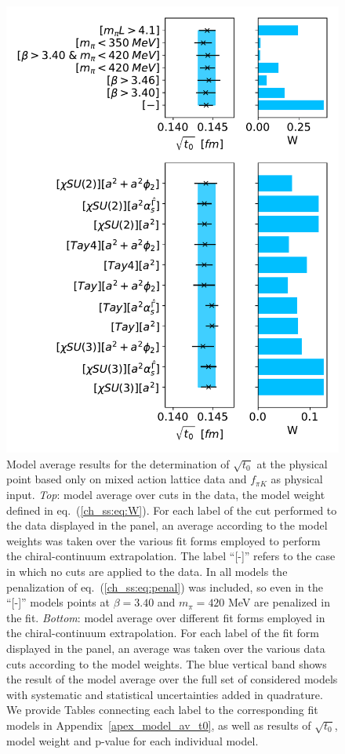 \begin{figure}
    \centering
    \includegraphics[width=1.\textwidth]{./cap5/figs/BMA_tm_subav_c=1_cphi=0.0035.pdf}
    \caption{Model average results for the determination of $\sqrt{t_0}$ at the physical point based only on mixed action lattice data and $f_{\pi K}$ as physical input. \textit{Top}: model average over cuts in the data, the model weight defined in eq.~(\ref{ch_ss:eq:W}). For each label of the cut performed to the data displayed in the panel, an average according to the model weights was taken over the various fit forms employed to perform the chiral-continuum extrapolation. The label ``[-]'' refers to the case in which no cuts are applied to the data. In all models the penalization of eq.~(\ref{ch_ss:eq:penal}) was included, so even in the ``[-]'' models points at $\beta=3.40$ and $m_{\pi}=420$ MeV are penalized in the fit. \textit{Bottom}: model average over different fit forms employed in  the chiral-continuum extrapolation. For each label of the fit form displayed in the panel, an average was taken over the various data cuts according to the model weights. The blue vertical band shows the result of the model average over the full set of considered models with systematic and statistical uncertainties added in quadrature. We provide Tables connecting each label to the corresponding fit models in Appendix~\ref{apex_model_av_t0}, as well as results of $\sqrt{t_0}$, model weight and p-value for each individual model.}
    \label{ch_ss:fig:BMA_tm}
\end{figure}


